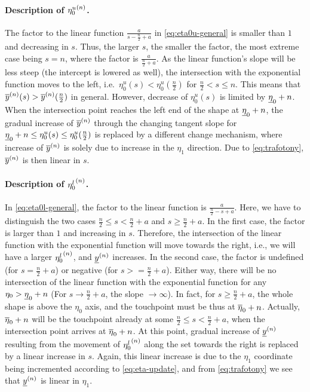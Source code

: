 \paragraph{Description of ${\eta_0^u}^{(n)}$.}

The factor to the linear function $\frac{a}{s - \frac{n}{2} + a}$
in \eqref{eq:eta0u-general} is smaller than $1$ and decreasing in $s$.
Thus, the larger $s$, the smaller the factor, the most extreme case being $s=n$,
where the factor is $\frac{a}{\frac{n}{2} + a}$.
As the linear function's slope will be less steep (the intercept is lowered as well),
the intersection with the exponential function moves to the left,
i.e.\ $\eta_0^u(s) < \eta_0^u(\frac{n}{2})$ for $\frac{n}{2} < s \le n$.
This means that $\overline{y}^{(n)}(s) > \overline{y}^{(n)}(\frac{n}{2})$ in general.
However, decrease of $\eta_0^u(s)$ is limited by $\underline{\eta}_0+n$.
When the intersection point reaches the left end of the shape at $\underline{\eta}_0+n$,
the gradual increase of $\overline{y}^{(n)}$ through the changing tangent slope 
for $\underline{\eta}_0+n \le \eta_0^u(s) \le \eta_0^u(\frac{n}{2})$ is replaced
by a different change mechanism,
where increase of $\overline{y}^{(n)}$ is solely due to increase in the $\eta_1$ direction.
Due to \eqref{eq:trafotony}, $\overline{y}^{(n)}$ is then linear in $s$.

\paragraph{Description of ${\eta_0^l}^{(n)}$.}

In \eqref{eq:eta0l-general}, the factor to the linear function is $\frac{a}{\frac{n}{2} - s + a}$.
Here, we have to distinguish the two cases $\frac{n}{2} \le s < \frac{n}{2} + a$
and $s \ge \frac{n}{2} + a$.
In the first case, the factor is larger than $1$ and increasing in $s$.
Therefore, the intersection of the linear function with the exponential function
will move towards the right, i.e., we will have a larger ${\eta_0^l}^{(n)}$, and $\underline{y}^{(n)}$ increases.
In the second case, the factor is undefined (for $s = \frac{n}{2} + a$)
or negative (for $s > = \frac{n}{2} + a$).
Either way, there will be no intersection of the linear function with the exponential function
for any $\eta_0 > \underline{\eta}_0 + n$ (For $s \to \frac{n}{2} + a$, the slope $\to \infty$).
In fact, for $s \ge \frac{n}{2} + a$, the whole shape is above the $\eta_0$ axis,
and the touchpoint must be thus at $\overline{\eta}_0 + n $.
Actually, $\overline{\eta}_0 + n$ will be the touchpoint already at some $\frac{n}{2} \le s < \frac{n}{2} + a$,
when the intersection point arrives at $\overline{\eta}_0 + n$.
At this point, gradual increase of $\underline{y}^{(n)}$ resulting from the movement of ${\eta_0^l}^{(n)}$ along the set
towards the right is replaced by a linear increase in $s$.
Again, this linear increase is due to the $\eta_1$ coordinate being incremented
according to \eqref{eq:eta-update},
and from \eqref{eq:trafotony} we see that $\underline{y}^{(n)}$ is linear in $\eta_1$.


